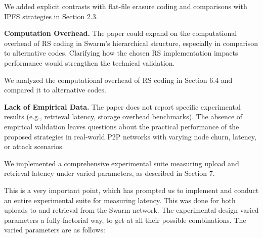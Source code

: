\documentclass[11pt]{article}
\newcommand{\us}{\rm \setlength{\leftskip}{0.3cm} \setlength{\rightskip}{0.3cm}}
\newcommand{\them}{\it \setlength{\leftskip}{0cm} \setlength{\rightskip}{0cm}}
\begin{document}
\us
We added explicit contrasts with flat-file erasure coding and comparisons with IPFS strategies in Section 2.3.

\them

\textbf{Computation Overhead.} The paper could expand on the computational overhead of RS coding in Swarm's hierarchical structure, especially in comparison to alternative codes. Clarifying how the chosen RS implementation impacts performance would strengthen the technical validation.

\us
We analyzed the computational overhead of RS coding in Section 6.4 and compared it to alternative codes.

\them

\textbf{Lack of Empirical Data.} The paper does not report specific experimental results (e.g., retrieval latency, storage overhead benchmarks). The absence of empirical validation leaves questions about the practical performance of the proposed strategies in real-world P2P networks with varying node churn, latency, or attack scenarios.

\us
We implemented a comprehensive experimental suite measuring upload and retrieval latency under varied parameters, as described in Section 7.

This is a very important point, which has prompted us to implement and conduct an entire experimental suite for measuring latency. This was done for both uploads to and retrieval from the Swarm network. The experimental design varied parameters a fully-factorial way, to get at all their possible combinations. The varied parameters are as follows:
\end{document}
